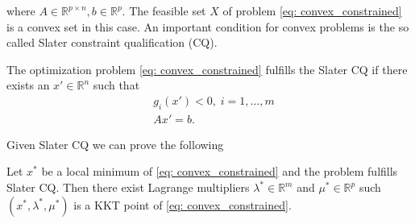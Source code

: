 where $A \in \mathbb{R}^{p\times n}, b\in \mathbb{R}^{p}$. The feasible set
$X$ of problem \ref{eq: convex_constrained} is a convex set in this case. An
important condition for convex problems is the so called Slater constraint
qualification (CQ).
\begin{definition}
    The optimization problem \ref{eq: convex_constrained} fulfills the Slater
    CQ if there exists an $x' \in \mathbb{R}^{n}$ such that
    \begin{align}
        &g_i(x') < 0,\; i=1,\ldots,m \\
        &Ax' = b.
    \end{align}
\end{definition}
Given Slater CQ we can prove the following

\begin{theorem}
    Let $ x^{*} $ be a local minimum of \ref{eq: convex_constrained} and the
    problem fulfills Slater CQ. Then there exist Lagrange multipliers
    $\lambda^{*} \in \mathbb{R}^{m}$ and $\mu^{*} \in \mathbb{R}^{p}$  such
    $(x^{*},\lambda^{*},\mu^{*})$ is a KKT point of
    \ref{eq: convex_constrained}.
\end{theorem}
